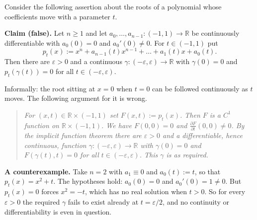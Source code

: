 \begin{example}
\label{ex:knoerrer_wrong_partial_derivative}
Consider the following assertion about the roots of a polynomial whose coefficients move with a
parameter $t$.

\textbf{Claim (false).} Let $n \ge 1$ and let $a_0,\dots,a_{n-1} : (-1,1) \to \mathbb{R}$ be
continuously differentiable with $a_0(0) = 0$ and $a_0'(0) \neq 0$. For $t \in (-1,1)$ put
\[p_t(x) := x^n + a_{n-1}(t)x^{n-1} + \dots + a_1(t)x + a_0(t).\]
Then there are $\varepsilon > 0$ and a continuous $\gamma : (-\varepsilon,\varepsilon) \to
\mathbb{R}$ with $\gamma(0) = 0$ and $p_t(\gamma(t)) = 0$ for all
$t \in (-\varepsilon,\varepsilon)$.

Informally: the root sitting at $x = 0$ when $t = 0$ can be followed continuously as $t$ moves.
The following argument for it is wrong.

\begin{quote}
\itshape
For $(x,t) \in \mathbb{R}\times(-1,1)$ set $F(x,t) := p_t(x)$. Then $F$ is a $C^1$ function on
$\mathbb{R}\times(-1,1)$. We have $F(0,0) = 0$ and $\frac{\partial F}{\partial t}(0,0) \neq 0$. By
the implicit function theorem there are $\varepsilon > 0$ and a differentiable, hence continuous,
function $\gamma : (-\varepsilon,\varepsilon) \to \mathbb{R}$ with $\gamma(0) = 0$ and
$F(\gamma(t),t) = 0$ for all $t \in (-\varepsilon,\varepsilon)$. This $\gamma$ is as required.
\end{quote}

\textbf{A counterexample.} Take $n = 2$ with $a_1 \equiv 0$ and $a_0(t) := t$, so that
$p_t(x) = x^2 + t$. The hypotheses hold: $a_0(0) = 0$ and $a_0'(0) = 1 \neq 0$. But $p_t(x) = 0$
forces $x^2 = -t$, which has no real solution when $t > 0$. So for every $\varepsilon > 0$ the
required $\gamma$ fails to exist already at $t = \varepsilon/2$, and no continuity or
differentiability is even in question.


\end{example}
